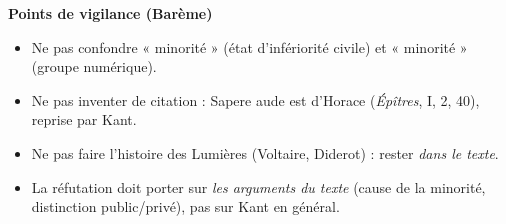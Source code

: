 \documentclass[11pt]{article}
\begin{document}
\begin{corrige}
\textbf{Points de vigilance (Barème)}\par
\begin{itemize}
\item Ne pas confondre « minorité » (état d'infériorité civile) et « minorité » (groupe numérique).
\item Ne pas inventer de citation : \guillemotleft Sapere aude \guillemotright est d'Horace (\emph{Épîtres}, I, 2, 40), reprise par Kant.
\item Ne pas faire l'histoire des Lumières (Voltaire, Diderot) : rester \emph{dans le texte}.
\item La réfutation doit porter sur \emph{les arguments du texte} (cause de la minorité, distinction public/privé), pas sur Kant en général.
\end{itemize}
\end{corrige}
\end{document}
